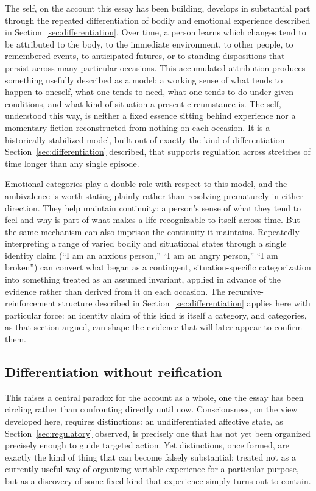 \documentclass[11pt]{article}
\begin{document}
The self, on the account this essay has been building, develops in substantial part through the repeated differentiation of bodily and emotional experience described in Section~\ref{sec:differentiation}. Over time, a person learns which changes tend to be attributed to the body, to the immediate environment, to other people, to remembered events, to anticipated futures, or to standing dispositions that persist across many particular occasions. This accumulated attribution produces something usefully described as a model: a working sense of what tends to happen to oneself, what one tends to need, what one tends to do under given conditions, and what kind of situation a present circumstance is. The self, understood this way, is neither a fixed essence sitting behind experience nor a momentary fiction reconstructed from nothing on each occasion. It is a historically stabilized model, built out of exactly the kind of differentiation Section~\ref{sec:differentiation} described, that supports regulation across stretches of time longer than any single episode.

Emotional categories play a double role with respect to this model, and the ambivalence is worth stating plainly rather than resolving prematurely in either direction. They help maintain continuity: a person's sense of what they tend to feel and why is part of what makes a life recognizable to itself across time. But the same mechanism can also imprison the continuity it maintains. Repeatedly interpreting a range of varied bodily and situational states through a single identity claim (``I am an anxious person,'' ``I am an angry person,'' ``I am broken'') can convert what began as a contingent, situation-specific categorization into something treated as an assumed invariant, applied in advance of the evidence rather than derived from it on each occasion. The recursive-reinforcement structure described in Section~\ref{sec:differentiation} applies here with particular force: an identity claim of this kind is itself a category, and categories, as that section argued, can shape the evidence that will later appear to confirm them.

\subsection{Differentiation without reification}

This raises a central paradox for the account as a whole, one the essay has been circling rather than confronting directly until now. Consciousness, on the view developed here, requires distinctions: an undifferentiated affective state, as Section~\ref{sec:regulatory} observed, is precisely one that has not yet been organized precisely enough to guide targeted action. Yet distinctions, once formed, are exactly the kind of thing that can become falsely substantial: treated not as a currently useful way of organizing variable experience for a particular purpose, but as a discovery of some fixed kind that experience simply turns out to contain.
\end{document}

